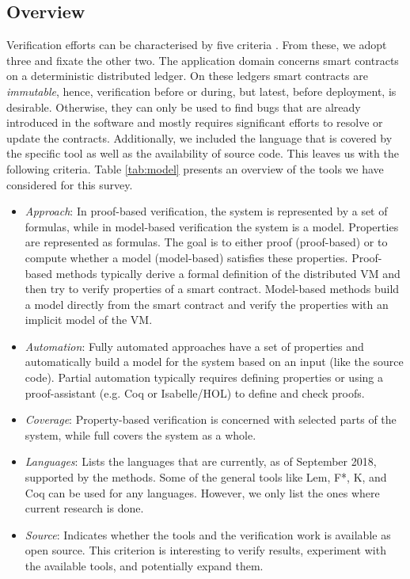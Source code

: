 \subsection{Overview}

Verification efforts can be characterised by five criteria \cite[173]{Huth2004}. From these, we adopt three and fixate the other two. 
The application domain concerns smart contracts on a deterministic distributed ledger.
On these ledgers smart contracts are \emph{immutable}, hence, verification before or during, but latest, before deployment, is desirable. Otherwise, they can only be used to find bugs that are already introduced in the software and mostly requires significant efforts to resolve or update the contracts.
Additionally, we included the language that is covered by the specific tool as well as the availability of source code.
This leaves us with the following criteria.
Table \ref{tab:model} presents an overview of the tools we have considered for this survey.

\begin{itemize}
\item \emph{Approach}: In proof-based verification, the system is represented by a set of formulas, while in model-based verification the system is a model. Properties are represented as formulas. The goal is to either proof (proof-based) or to compute whether a model (model-based) satisfies these properties. Proof-based methods typically derive a formal definition of the distributed VM and then try to verify properties of a smart contract. Model-based methods build a model directly from the smart contract and verify the properties with an implicit model of the VM.
\item \emph{Automation}: Fully automated approaches have a set of properties and automatically build a model for the system based on an input (like the source code). Partial automation typically requires defining properties or using a proof-assistant (e.g. Coq or Isabelle/HOL) to define and check proofs.
\item \emph{Coverage}: Property-based verification is concerned with selected parts of the system, while full covers the system as a whole.
\item \emph{Languages}: Lists the languages that are currently, as of September 2018, supported by the methods. Some of the general tools like Lem, F*, K, and Coq can be used for any languages. However, we only list the ones where current research is done.
\item \emph{Source}: Indicates whether the tools and the verification work is available as open source. This criterion is interesting to verify results, experiment with the available tools, and potentially expand them.
\end{itemize}

